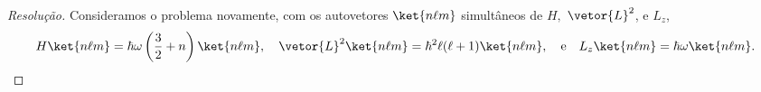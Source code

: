 \begin{proof}[Resolução]
    Consideramos o problema novamente, com os autovetores \(\ket{n \ell m}\) simultâneos de \(H,\) \(\vetor{L}^2\), e \(L_z\),
    \begin{equation*}
        H\ket{n \ell m} = \hbar \omega \left(\frac32 + n\right) \ket{n \ell m},\quad
        \vetor{L}^2\ket{n \ell m} = \hbar^2 \ell(\ell + 1) \ket{n \ell m},\quad\text{e}\quad
        L_z\ket{n \ell m} = \hbar \omega \ket{n \ell m}.
    \end{equation*}

\end{proof}
